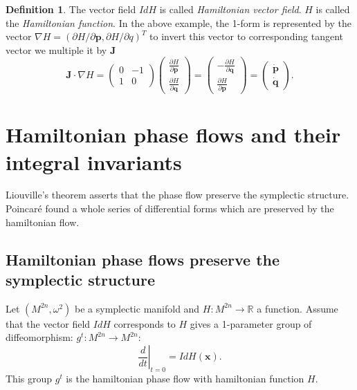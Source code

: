 \documentclass{book}
\numberwithin{equation}{section}
\theoremstyle{plain}
\theoremstyle{definition}
\newtheorem*{defn*}{Definition}
\theoremstyle{remark}
\theoremstyle{remark}
\begin{document}
\begin{defn*}
%
The vector field $IdH$ is called \emph{Hamiltonian vector field}.
%
$H$ is called the \emph{Hamiltonian function}.
%
In the above example,
the 1-form is represented by the vector
$\nabla H = (\partial H/\partial \mathbf p, \partial H/\partial q)^T$
to invert this vector to corresponding tangent vector we multiple it by $\mathbf J$
%
\[
\mathbf J \cdot \nabla H
=
\left(
  \begin{array}{ccc}
    0 & -1 \\
    1 & 0
  \end{array}
\right)
\left(
  \begin{array}{ccc}
    \frac{ \partial H }{ \partial \mathbf p } \\
    \frac{ \partial H }{ \partial \mathbf q }
  \end{array}
\right)
=
\left(
  \begin{array}{ccc}
    -\frac{ \partial H }{ \partial \mathbf q } \\
    \frac{ \partial H }{ \partial \mathbf p }
  \end{array}
\right)
=
\left(
  \begin{array}{ccc}
    \dot{\mathbf p} \\
    \dot{\mathbf q}
  \end{array}
\right).
\]
\end{defn*}


\section{Hamiltonian phase flows and their integral invariants}

Liouville's theorem asserts that the phase flow
preserve the symplectic structure.
%
Poincar\'e found a whole series of differential forms
which are preserved by the hamiltonian flow.

\subsection{Hamiltonian phase flows preserve the symplectic structure}

Let $(M^{2n}, \omega^2)$ be a symplectic manifold and
$H: M^{2n} \rightarrow \mathbb{R}$ a function.
Assume that the vector field $IdH$
corresponds to $H$ gives a 1-parameter group
of diffeomorphism: $g^t: M^{2n} \rightarrow M^{2n}$:
$$
\left.\frac{d}{dt}\right|_{t = 0}
= I dH(\mathbf x).
$$
This group $g^t$ is the hamiltonian phase flow with
hamiltonian function $H$.
\end{document}
